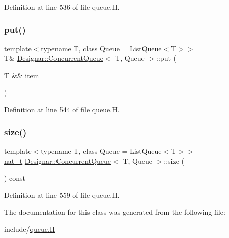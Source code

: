 Definition at line 536 of file queue.\+H.

\mbox{\label{class_designar_1_1_concurrent_queue_aacc6c771061780c42058303f300b5acb}} 
\subsubsection{\texorpdfstring{put()}{put()}\hspace{0.1cm}{\footnotesize\ttfamily [2/2]}}
{\footnotesize\ttfamily template$<$typename T, class Queue = List\+Queue$<$\+T$>$$>$ \\
T\& \hyperlink{class_designar_1_1_concurrent_queue}{Designar\+::\+Concurrent\+Queue}$<$ T, Queue $>$\+::put (\begin{DoxyParamCaption}\item[{T \&\&}]{item }\end{DoxyParamCaption})\hspace{0.3cm}{\ttfamily [inline]}}



Definition at line 544 of file queue.\+H.

\mbox{\label{class_designar_1_1_concurrent_queue_acbeaea381f53471ea17366ab7a5fc52d}} 
\subsubsection{\texorpdfstring{size()}{size()}}
{\footnotesize\ttfamily template$<$typename T, class Queue = List\+Queue$<$\+T$>$$>$ \\
\hyperlink{namespace_designar_aa72662848b9f4815e7bf31a7cf3e33d1}{nat\+\_\+t} \hyperlink{class_designar_1_1_concurrent_queue}{Designar\+::\+Concurrent\+Queue}$<$ T, Queue $>$\+::size (\begin{DoxyParamCaption}{ }\end{DoxyParamCaption}) const\hspace{0.3cm}{\ttfamily [inline]}}



Definition at line 559 of file queue.\+H.



The documentation for this class was generated from the following file\+:\begin{DoxyCompactItemize}
\item 
include/\hyperlink{queue_8_h}{queue.\+H}\end{DoxyCompactItemize}
